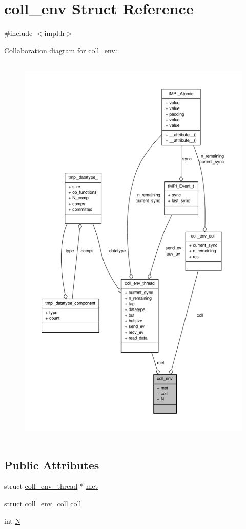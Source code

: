 \hypertarget{structcoll__env}{\section{coll\-\_\-env \-Struct \-Reference}
\label{structcoll__env}
}


{\ttfamily \#include $<$impl.\-h$>$}



\-Collaboration diagram for coll\-\_\-env\-:
\nopagebreak
\begin{figure}[H]
\begin{center}
\leavevmode
\includegraphics[height=550pt]{structcoll__env__coll__graph}
\end{center}
\end{figure}
\subsection*{\-Public \-Attributes}
\begin{DoxyCompactItemize}
\item 
struct \hyperlink{structcoll__env__thread}{coll\-\_\-env\-\_\-thread} $\ast$ \hyperlink{structcoll__env_afef5ad9b367d1d9b1898f29973971395}{met}
\item 
struct \hyperlink{structcoll__env__coll}{coll\-\_\-env\-\_\-coll} \hyperlink{structcoll__env_a47d1663e7773c457d5da0bdcbcfeadfb}{coll}
\item 
int \hyperlink{structcoll__env_aae0cf3b2f94c5a0a2e69308fc35afa19}{\-N}
\end{DoxyCompactItemize}


